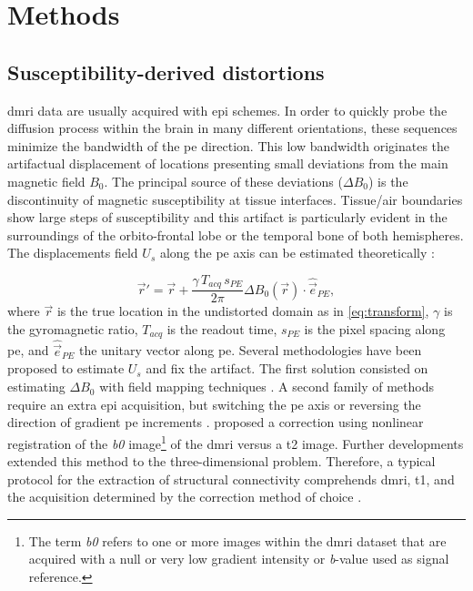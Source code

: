 \section{Methods}
\label{sec:methods}
%

\subsection{Susceptibility-derived distortions}
\label{sec:distortions}
\Gls*{dmri} data are usually acquired with \gls*{epi} schemes.
In order to quickly probe the diffusion process within the brain in many different orientations,
  these sequences minimize the bandwidth of the \gls*{pe} direction.
This low bandwidth originates the artifactual displacement of locations presenting small deviations
  from the main magnetic field $B_0$.
The principal source of these deviations ($\Delta B_0$) is the discontinuity of magnetic
  susceptibility at tissue interfaces.
Tissue/air boundaries show large steps of susceptibility and this artifact is
  particularly evident in the surroundings of the orbito-frontal lobe or the temporal
  bone of both hemispheres.
The displacements field $U_s$ along the \gls*{pe} axis can be estimated theoretically
  \citep{jezzard_correction_1995}:

  \begin{equation}
  \vec{r}' = \vec{r} + \frac{\gamma \, T_{acq}\, s_{PE}}{2\pi}\Delta B_0(\vec{r}) \cdot \hat{\vec{e}}_{PE},
  \label{eq:fieldmap}
  \end{equation}
%
where $\vec{r}$ is the true location in the undistorted domain as in \eqref{eq:transform},
  $\gamma$ is the gyromagnetic ratio, $T_{acq}$ is the readout time,
  $s_{PE}$ is the pixel spacing along \gls*{pe}, and $\hat{\vec{e}}_{PE}$ the unitary
  vector along \gls*{pe}.
Several methodologies have been proposed to estimate $U_s$ and fix the artifact.
The first solution consisted on estimating $\Delta B_0$ with field mapping
  techniques \citep{andersson_modeling_2001}.
A second family of methods require an extra \gls*{epi} acquisition, but switching
  the \gls*{pe} axis \citep{chiou_simple_2000} or reversing the direction of gradient \gls*{pe}
  increments \citep{cordes_geometric_2000,holland_efficient_2010}.
\cite{kybic_unwarping_2000} proposed a correction using nonlinear registration of the \emph{b0}
  image\footnote{The term \emph{b0} refers to one or more images within the
  \gls*{dmri} dataset that are acquired with a null or very low gradient intensity or
   \emph{b}-value used as signal reference.} of the \gls*{dmri} versus a \gls*{t2} image.
Further developments \citep{irfanoglu_susceptibility_2011} extended this method to the
  three-dimensional problem.
Therefore, a typical protocol for the extraction of structural connectivity
  comprehends \gls*{dmri}, \gls*{t1}, and the acquisition determined by the correction
  method of choice \citep{daducci_connectome_2012}.


